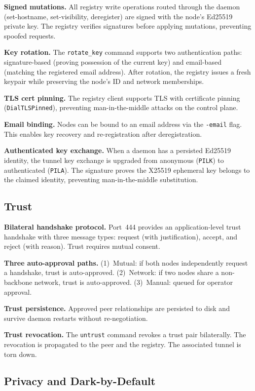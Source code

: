 \documentclass[11pt,a4paper]{article}
\begin{document}
\textbf{Signed mutations.} All registry write operations routed through the daemon (set-hostname, set-visibility, deregister) are signed with the node's Ed25519 private key. The registry verifies signatures before applying mutations, preventing spoofed requests.

\textbf{Key rotation.} The \texttt{rotate\_key} command supports two authentication paths: signature-based (proving possession of the current key) and email-based (matching the registered email address). After rotation, the registry issues a fresh keypair while preserving the node's ID and network memberships.

\textbf{TLS cert pinning.} The registry client supports TLS with certificate pinning (\texttt{DialTLSPinned}), preventing man-in-the-middle attacks on the control plane.

\textbf{Email binding.} Nodes can be bound to an email address via the \texttt{-email} flag. This enables key recovery and re-registration after deregistration.

\textbf{Authenticated key exchange.} When a daemon has a persisted Ed25519 identity, the tunnel key exchange is upgraded from anonymous (\texttt{PILK}) to authenticated (\texttt{PILA}). The signature proves the X25519 ephemeral key belongs to the claimed identity, preventing man-in-the-middle substitution.

\subsection{Trust}

\textbf{Bilateral handshake protocol.} Port~444 provides an application-level trust handshake with three message types: request (with justification), accept, and reject (with reason). Trust requires mutual consent.

\textbf{Three auto-approval paths.} (1)~Mutual: if both nodes independently request a handshake, trust is auto-approved. (2)~Network: if two nodes share a non-backbone network, trust is auto-approved. (3)~Manual: queued for operator approval.

\textbf{Trust persistence.} Approved peer relationships are persisted to disk and survive daemon restarts without re-negotiation.

\textbf{Trust revocation.} The \texttt{untrust} command revokes a trust pair bilaterally. The revocation is propagated to the peer and the registry. The associated tunnel is torn down.

\subsection{Privacy and Dark-by-Default}
\end{document}
